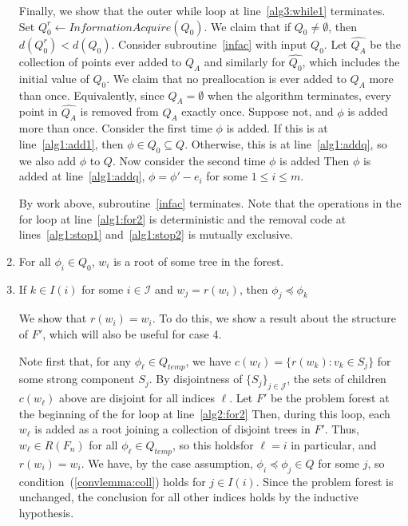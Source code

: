 \documentclass[11pt,reqno]{amsart}
\theoremstyle{definition}
\numberwithin{equation}{section}
\newcommand{\wh}{\widehat}
\newcommand{\pre}{\phi}
\newcommand{\sub}{\subseteq}
\newcommand{\peq}{\preceq}
\newcommand{\strongcomp}{S}
\newcommand{\acto}{Q_0}
\newcommand{\acta}{Q_A}
\newcommand{\act}{Q}
\newcommand{\actt}{Q_{temp}}
\newcommand{\actacum}{\wh{Q_A}}
\newcommand{\actocum}{\wh{Q_0}}
\newcommand{\coll}{I}
\newcommand{\forest}{F}
\newcommand{\roott}{R}
\begin{document}
\begin{enumerate}
Finally, we show that the outer while loop at line~\ref{alg3:while1} terminates.
Set $\acto^r \leftarrow InformationAcquire(\acto)$. 
We claim that if $\acto \not = \emptyset$, then $d(\acto^r) < d(\acto)$. 
Consider subroutine~\ref{infac} with input $\acto$. 
Let $\actacum$ be the collection of points ever added to $\acta$ and similarly for $\actocum$, which includes the initial value of $\acto$. 
We claim that no preallocation is ever added to $\acta$ more than once. 
Equivalently, since $\acta = \emptyset$ when the algorithm terminates, every point in $\actacum$ is removed from $\acta$ exactly once. 
Suppose not, and $\pre$ is added more than once. 
Consider the first time $\pre$ is added. 
If this is at line~\ref{alg1:add1}, then $\pre \in \acto \sub \act$.
Otherwise, this is at line~\ref{alg1:addq}, so we also add $\pre$ to $\act$.
Now consider the second time $\pre$ is added 
Then $\pre$ is added at line~\ref{alg1:addq}, $\pre = \pre' - e_i$ for some $1 \leq i \leq m$.


By work above, subroutine~\ref{infac} terminates.
Note that the operations in the for loop at line~\ref{alg1:for2} is deterministic and the removal code at lines~\ref{alg1:stop1} and~\ref{alg1:stop2} is mutually exclusive. 

\item For all $\pre_i \in \acto$, $w_i$ is a root of some tree in the forest.

\item If $k \in \coll(i)$ for some $i \in \mathcal{I}$ and $w_j = r(w_i)$, then $\pre_j \peq \pre_k$ \label{lemma:coll}

We show that $r(w_i) = w_i$. 
To do this, we show a result about the structure of $\forest'$, which will also be useful for case 4. 

Note first that, for any $\pre_{\ell} \in \actt$, we have $c(w_{\ell}) = \{r(w_k): v_k \in \strongcomp_j\}$ for some strong component $\strongcomp_j$. 
By disjointness of $\{\strongcomp_j\}_{j \in \mathcal{J}}$, the sets of children $c(w_{\ell})$ above are disjoint for all indices $\ell$. %
Let $\forest'$ be the problem forest at the beginning of the for loop at line~\ref{alg2:for2}
Then, during this loop, each $w_{\ell}$ is added as a root joining a collection of disjoint trees in $\forest'$. 
Thus, $w_{\ell} \in \roott(F_n)$ for all $\pre_{\ell} \in \actt$, so this holdsfor $\ell = i$ in particular, and $r(w_i) = w_i$. 
We have, by the case assumption, $\pre_i \peq \pre_j \in \act$ for some $j$, so  condition~(\ref{convlemma:coll}) holds for $j \in \coll(i)$. 
Since the problem forest is unchanged, the conclusion for all other indices holds by the inductive hypothesis. 


\end{enumerate}
\end{document}

